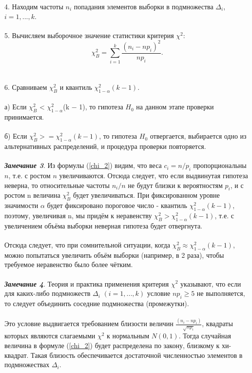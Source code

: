 4. Находим частоты $n_{i}$ попадания элементов выборки в подмножества $\Delta_{i}$, $i = 1, ... ,k$. 
\\\\
5. Вычисляем выборочное значение статистики критерия $\chi^{2}$:
\begin{equation}
\chi^{2}_{B} =\sum_{i = 1}^{k}{\frac{(n_{i} - np_{i})^{2}}{np_{i}}}.
\label{chi_B}
\end{equation}
\\\\
6. Сравниваем $\chi^{2}_{B}$ и квантиль $\chi^{2}_{1-\alpha}(k-1)$.
\\\\
а) Если $\chi^{2}_{B}$ < $\chi^{2}_{1-\alpha}$(k $-$ 1), то гипотеза $H_{0}$ на данном этапе проверки принимается. 
\\\\
б) Если $\chi^{2}_{B} >= \chi^{2}_{1-\alpha}(k -1)$, то гипотеза $H_{0}$ отвергается, выбирается одно из альтернативных распределений, и процедура проверки повторяется.
\\\\
\textbf{\textit{Замечание 3}}. Из формулы (\ref{chi_2}) видим, что веса $c_i = n/p_{i}$ пропорциональны $n$, т.е. с ростом $n$ увеличиваются. Отсюда следует, что если выдвинутая гипотеза неверна, то относительные частоты $n_{i}/n$ не будут близки к вероятностям $p_{i}$, и с ростом n величина  $\chi^{2}_{B}$  будет увеличиваться. При фиксированном уровне значимости $\alpha$ будет фиксировано пороговое число - квантиль $\chi^{2}_{1-\alpha}(k-1)$, поэтому, увеличивая n, мы придём к неравенству $\chi^{2}_{B} > \chi^{2}_{1-\alpha}(k-1)$, т.е. с увеличением объёма выборки неверная гипотеза будет отвергнута.
\\\\
Отсюда следует, что при сомнительной ситуации, когда $\chi^{2}_{B} \approx \chi^{2}_{1-\alpha}(k-1)$, можно попытаться увеличить объём выборки (например, в 2 раза), чтобы требуемое неравенство было более чётким.
\\\\
\textbf{\textit{Замечание 4}}. Теория и практика применения критерия  $\chi^{2}$ указывают, что если для каких-либо подмножеств $\Delta_{i}$ $(i = 1, ... ,k)$ условие $np_{i} \geq 5$ не выполняется, то следует объединить соседние подмножества (промежутки).
\\\\
Это условие выдвигается требованием близости величин $\frac{(n_{i} -np_{i})}{\sqrt{np_{i}}}$, квадраты которых являются слагаемыми $\chi^{2}$  к нормальным $N(0,1)$. Тогда случайная величина в формуле (\ref{chi_2}) будет распределена по закону, близкому к хи-квадрат. Такая близость обеспечивается достаточной численностью элементов в подмножествах $\Delta_{i}$.


